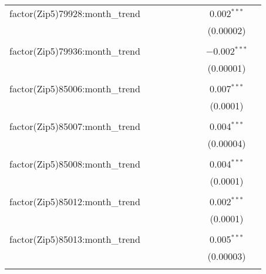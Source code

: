 \begin{table}[H]
{\begin{tabular}{@{\extracolsep{5pt}}lcccccccc}
  factor(Zip5)79928:month\_trend &  &  &  &  &  &  & 0.002$^{***}$ &  \\  

   &  &  &  &  &  &  & (0.00002) &  \\  

   & & & & & & & & \\  

  factor(Zip5)79936:month\_trend &  &  &  &  &  &  & $-$0.002$^{***}$ &  \\  

   &  &  &  &  &  &  & (0.00001) &  \\  

   & & & & & & & & \\  

  factor(Zip5)85006:month\_trend &  &  &  &  &  &  & 0.007$^{***}$ &  \\  

   &  &  &  &  &  &  & (0.0001) &  \\  

   & & & & & & & & \\  

  factor(Zip5)85007:month\_trend &  &  &  &  &  &  & 0.004$^{***}$ &  \\  

   &  &  &  &  &  &  & (0.00004) &  \\  

   & & & & & & & & \\  

  factor(Zip5)85008:month\_trend &  &  &  &  &  &  & 0.004$^{***}$ &  \\  

   &  &  &  &  &  &  & (0.0001) &  \\  

   & & & & & & & & \\  

  factor(Zip5)85012:month\_trend &  &  &  &  &  &  & 0.002$^{***}$ &  \\  

   &  &  &  &  &  &  & (0.0001) &  \\  

   & & & & & & & & \\  

  factor(Zip5)85013:month\_trend &  &  &  &  &  &  & 0.005$^{***}$ &  \\  

   &  &  &  &  &  &  & (0.00003) &  \\  

   & & & & & & & & \\  


\end{tabular}}
\end{table}
